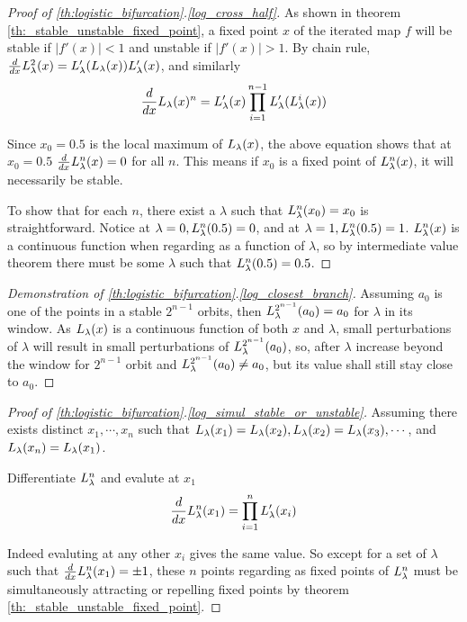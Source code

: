 \begin{proof}[Proof of \ref{th:logistic_bifurcation}.\ref{log_cross_half}]
	As shown in theorem \ref{th:_stable_unstable_fixed_point}, a fixed point $x$ of the iterated map $f$ will be stable if $|f'(x)| < 1$ and unstable if $|f'(x)| > 1$.
	By chain rule, 
	$\frac{d}{dx}L_{\lambda}^2 (x) = L_{\lambda}'(L_{\lambda}(x))L_{\lambda}'(x)$, and similarly
	$$
		\frac{d}{dx} L_{\lambda}(x)^n = L_{\lambda}'(x)\prod_{i=1}^{n-1} L_{\lambda}'(L_{\lambda}^i(x))
	$$

	Since $x_0 = 0.5$ is the local maximum of $L_{\lambda}(x)$, the above equation shows that at $x_0 = 0.5$ $\frac{d}{dx} L_{\lambda}^n(x) = 0$ for all $n$.
	This means if $x_0$ is a fixed point of $L_{\lambda}^n(x)$, it will necessarily be stable. 
	
	To show that for each $n$, there exist a $\lambda$ such that $L_{\lambda}^n(x_0) = x_0$ is straightforward. 
	Notice at $\lambda = 0, L_{\lambda}^n(0.5) = 0$, and at $\lambda = 1, L_{\lambda}^n(0.5) = 1$.
	$L_{\lambda}^n(x)$ is a continuous function when regarding as a function of $\lambda$, so by intermediate value theorem there must be some $\lambda$ such that $L_{\lambda}^n(0.5) = 0.5$.
\end{proof}

\begin{proof}[Demonstration of \ref{th:logistic_bifurcation}.\ref{log_closest_branch}]
	Assuming $a_0$ is one of the points in a stable $2^{n-1}$ orbits, then $L_{\lambda}^{2^{n-1}}(a_0)=a_0$ for $\lambda$ in its window.
	As $L_{\lambda}(x)$ is a continuous function of both $x$ and $\lambda$, small perturbations of $\lambda$ will result in small perturbations of $L_{\lambda}^{2^{n-1}}(a_0)$, so, after $\lambda$ increase beyond the window for $2^{n-1}$ orbit and $L_{\lambda}^{2^{n-1}}(a_0) \neq a_0$, but its value shall still stay close to $a_0$.
\end{proof}

\begin{proof}[Proof of \ref{th:logistic_bifurcation}.\ref{log_simul_stable_or_unstable}]
		Assuming there exists distinct $x_1, \cdots, x_n$ such that $L_{\lambda}(x_1) = L_{\lambda}(x_2), L_{\lambda}(x_2) = L_{\lambda}(x_3), \cdots $, and $L_{\lambda}(x_n) = L_{\lambda}(x_1)$.

		Differentiate $L_{\lambda}^n$ and evalute at $x_1$ 
		$$
		\frac{d}{dx} L_{\lambda}^n(x_1) = \prod_{i=1}^n L_{\lambda}'(x_i)
		$$

		Indeed evaluting at any other $x_i$ gives the same value. 
		So except for a set of $\lambda$ such that $\frac{d}{dx} L_{\lambda}^n(x_1) = \pm 1$, these $n$ points regarding as fixed points of $L_{\lambda}^n$ must be simultaneously attracting or repelling fixed points by theorem \ref{th:_stable_unstable_fixed_point}.
\end{proof}

